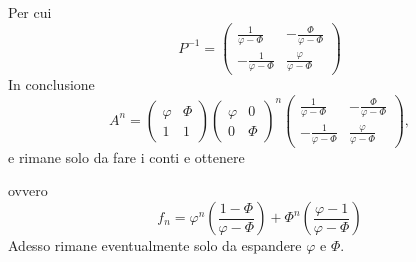 \documentclass{article}     %
\begin{document}
Per cui 
\[P^{ - 1} = \begin{pmatrix} \frac{1}{\varphi -\Phi}&-\frac{\Phi}{\varphi -\Phi}\\- \frac{1}{\varphi - \Phi}&\frac{\varphi}{\varphi -\Phi} \end{pmatrix} \]
In conclusione
\[A^n = \begin{pmatrix} \varphi &\Phi\\1&1 \end{pmatrix} \begin{pmatrix} \varphi &0\\0&\Phi \end{pmatrix}^n \begin{pmatrix} \frac{1}{\varphi -\Phi}&-\frac{\Phi}{\varphi -\Phi}\\- \frac{1}{\varphi - \Phi}&\frac{\varphi}{\varphi -\Phi} \end{pmatrix},\]
e rimane solo da fare i conti e ottenere
\grid[18.4cm]{}

ovvero 
\[f_n = \varphi^n\left( \dfrac{1 -\Phi}{\varphi -\Phi}\right) +\Phi^n\left( \dfrac{\varphi - 1}{\varphi - \Phi} \right)\]
Adesso rimane eventualmente solo da espandere $\varphi$ e $\Phi$.
\end{document}
